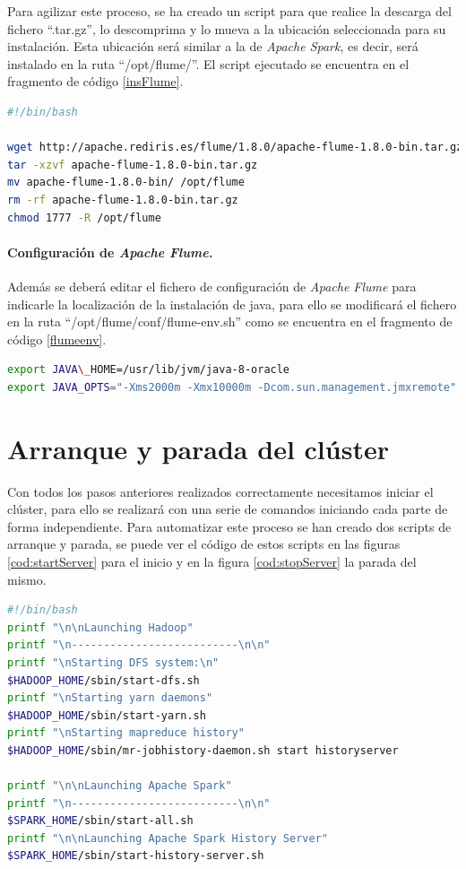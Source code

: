 Para agilizar este proceso, se ha creado un script para que realice la descarga del fichero ``.tar.gz'', lo descomprima y lo mueva a la ubicación seleccionada para su instalación. Esta ubicación será similar a la de \textit{Apache Spark}, es decir, será instalado en la ruta ``/opt/flume/''. El script ejecutado se encuentra en el fragmento de código \ref{insFlume}.

\begin{lstlisting}[label=insFlume,language=sh,frame=single,caption=Script de instalación de \textit{Apache Flume}.]
#!/bin/bash

wget http://apache.rediris.es/flume/1.8.0/apache-flume-1.8.0-bin.tar.gz
tar -xzvf apache-flume-1.8.0-bin.tar.gz
mv apache-flume-1.8.0-bin/ /opt/flume
rm -rf apache-flume-1.8.0-bin.tar.gz
chmod 1777 -R /opt/flume
\end{lstlisting}

\paragraph{Configuración de \textit{Apache Flume.}} Además se deberá editar el fichero de configuración de \textit{Apache Flume} para indicarle la localización de la instalación de java, para ello se modificará el fichero en la ruta ``/opt/flume/conf/flume-env.sh'' como se encuentra en el fragmento de código \ref{flumeenv}.

\begin{lstlisting}[label=flumeenv,language=sh,frame=single,caption=Línea a añadir a ``flume-env.sh''.]
export JAVA\_HOME=/usr/lib/jvm/java-8-oracle
export JAVA_OPTS="-Xms2000m -Xmx10000m -Dcom.sun.management.jmxremote"
\end{lstlisting}

\section{Arranque y parada del clúster}
Con todos los pasos anteriores realizados correctamente necesitamos iniciar el clúster, para ello se realizará con una serie de comandos iniciando cada parte de forma independiente. Para automatizar este proceso se han creado dos scripts de arranque y parada, se puede ver el código de estos scripts en las figuras \ref{cod:startServer} para el inicio y en la figura \ref{cod:stopServer} la parada del mismo.

\begin{lstlisting}[label=cod:startServer,language=sh,frame=single,caption=Script de inicio del clúster implementado.]
#!/bin/bash
printf "\n\nLaunching Hadoop"
printf "\n--------------------------\n\n"
printf "\nStarting DFS system:\n"
$HADOOP_HOME/sbin/start-dfs.sh
printf "\nStarting yarn daemons"
$HADOOP_HOME/sbin/start-yarn.sh
printf "\nStarting mapreduce history"
$HADOOP_HOME/sbin/mr-jobhistory-daemon.sh start historyserver

printf "\n\nLaunching Apache Spark"
printf "\n--------------------------\n\n"
$SPARK_HOME/sbin/start-all.sh
printf "\n\nLaunching Apache Spark History Server"
$SPARK_HOME/sbin/start-history-server.sh
\end{lstlisting}

